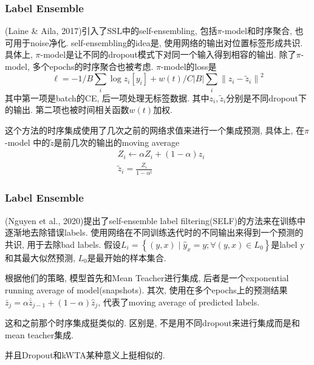 \documentclass{beamer}
\newenvironment{remark}[1][Remark]{\begin{trivlist}
    \item[\hskip \labelsep {\bfseries #1}]}{\end{trivlist}}
\begin{document}
\begin{frame}
    \frametitle{Label Ensemble}

    (Laine \& Aila, 2017)引入了SSL中的self-ensembling, 包括$\pi$-model和时序聚合, 也可用于noise净化. self-ensembling的idea是, 使用网络的输出对位置标签形成共识. 具体上, $\pi$-model是让不同的dropout模式下对同一个输入得到相容的输出. 除了$\pi$-model, 多个epochs的时序聚合也被考虑.
    $\pi$-model的loss是
    \begin{equation}
        \ell=-1 / B \sum_{i} \log z_{i}\left[y_{i}\right]+w(t) / C|B| \sum_{i}\left\|z_{i}-\tilde{z}_{i}\right\|^{2}
    \end{equation}
    其中第一项是batch的CE, 后一项处理无标签数据. 其中$z_i,\tilde z_i$分别是不同dropout下的输出. 第二项也被时间相关函数$w(t)$加权.

    这个方法的时序集成使用了几次之前的网络求值来进行一个集成预测, 具体上, 在$\pi$-model
    中的$\tilde z$是前几次的输出的moving average
    \begin{align}
        &Z_{i} \leftarrow \alpha Z_{i}+(1-\alpha) z_{i}\\
        &\tilde z_i = \frac{Z_i}{1-\alpha ^t}
    \end{align}

\end{frame}

\begin{frame}
    \frametitle{Label Ensemble}

    (Nguyen et al., 2020)提出了self-ensemble label filtering(SELF)的方法来在训练中逐渐地去除错误labels. 使用网络在不同训练迭代时的不同输出来得到一个预测的共识, 用于去除bad labels. 假设$L_{i}=\left\{(y, x) \mid \hat{y}_{x}=y ; \forall(y, x) \in L_{0}\right\}$是label y和其最大似然预测, $L_0$是最开始的样本集合. 

    根据他们的策略, 模型首先和Mean Teacher进行集成, 后者是一个exponential running average of model(snapshots). 其次, 使用在多个epochs上的预测结果
    $\bar{z}_{j}=\alpha \overline{\bar{z}}_{j-1}+(1-\alpha) \hat{z}_{j}$,
    代表了moving average of predicted labels.

    \begin{remark}
        这和之前那个时序集成挺类似的. 区别是, 不是用不同dropout来进行集成而是和mean teacher集成.

        并且Dropout和kWTA某种意义上挺相似的.
    \end{remark}

\end{frame}
\end{document}
